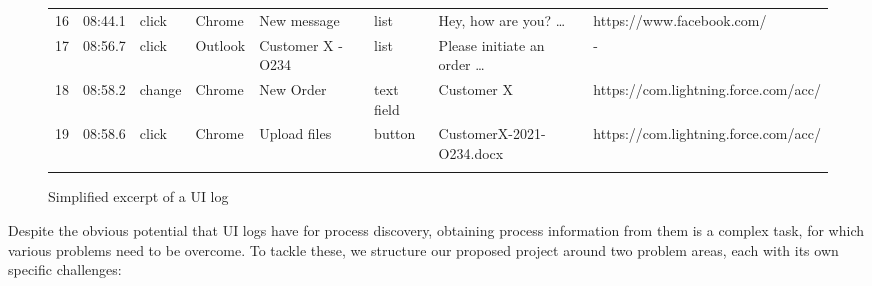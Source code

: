 \begin{figure}[h!]
\begin{adjustbox}{max width=\textwidth}
\begin{tabular}{llllllll}
16&08:44.1&click&Chrome&New message&list&Hey, how are you? …&https://www.facebook.com/\\\noalign{\smallskip}
17&08:56.7&click&Outlook&Customer X - O234&list&Please initiate an order …&-\\\noalign{\smallskip}
18&08:58.2&change&Chrome&New Order&text field&Customer X&https://com.lightning.force.com/acc/\\\noalign{\smallskip}
19&08:58.6&click&Chrome&Upload files&button&CustomerX-2021-O234.docx&https://com.lightning.force.com/acc/\\\noalign{\smallskip}
\hline\noalign{\smallskip}
\end{tabular}
\end{adjustbox}
\vspace{-1em}
\caption{Simplified excerpt of a UI log}
\label{fig:example}
\end{figure}

Despite the obvious potential that UI logs have for process discovery, obtaining process information from them is a complex task, for which various problems need to be overcome. To tackle these, we structure our proposed project around two problem areas, each with its own specific challenges:

